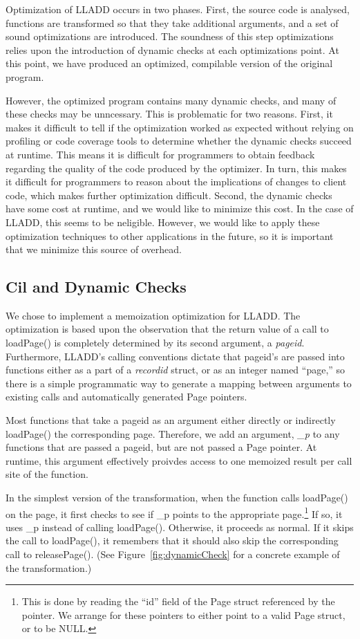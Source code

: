 \documentclass[10pt,letterpaper,twocolumn,english]{article}
\newcommand{\yad}{LLADD\xspace}
\newcommand{\pin}{loadPage()\xspace}
\newcommand{\unpin}{releasePage()\xspace}
\newcommand{\PP}{\_p\xspace}
\begin{document}
Optimization of \yad occurs in two phases.  First, the source code is
analysed, functions are transformed so that they take additional
arguments, and a set of sound optimizations are introduced.  The
soundness of this step optimizations relies upon the introduction of
dynamic checks at each optimizations point.  At this point, we have
produced an optimized, compilable version of the original program.

However, the optimized program contains many dynamic checks, and many
of these checks may be unncessary.  This is problematic for two
reasons.  First, it makes it difficult to tell if the optimization
worked as expected without relying on profiling or code coverage tools
to determine whether the dynamic checks succeed at runtime.  This
means it is difficult for programmers to obtain feedback regarding the
quality of the code produced by the optimizer.  In turn, this makes it
difficult for programmers to reason about the implications of changes
to client code, which makes further optimization difficult.  Second,
the dynamic checks have some cost at runtime, and we would like to
minimize this cost.  In the case of \yad, this seems to be neligible.
However, we would like to apply these optimization techniques to other
applications in the future, so it is important that we minimize this
source of overhead.

\subsection{Cil and Dynamic Checks}

We chose to implement a memoization optimization for \yad.  The
optimization is based upon the observation that the return value of a
call to \pin is completely determined by its second argument, a {\em
pageid}.  Furthermore, \yad's calling conventions dictate that
pageid's are passed into functions either as a part of a {\em
recordid} struct, or as an integer named ``page,'' so there is a
simple programmatic way to generate a mapping between arguments to
existing calls and automatically generated Page pointers.

Most functions that take a pageid as an argument either directly or
indirectly \pin the corresponding page.  Therefore, we add an
argument, {\em\PP} to any functions that are passed a pageid, but are
not passed a Page pointer.  At runtime, this argument effectively
proivdes access to one memoized result per call site of the
function.

In the simplest version of the transformation, when the function calls
\pin on the page, it first checks to see if \PP points to the
appropriate page.\footnote{This is done by reading the ``id'' field of
the Page struct referenced by the pointer.  We arrange for these
pointers to either point to a valid Page struct, or to be NULL.}  If
so, it uses \PP instead of calling \pin.  Otherwise, it proceeds as
normal.  If it skips the call to \pin, it remembers that it should
also skip the corresponding call to \unpin.  (See
Figure~\ref{fig:dynamicCheck} for a concrete example of the
transformation.)
\end{document}

